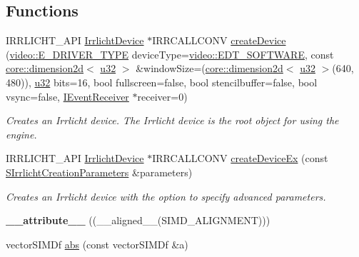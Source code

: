 \subsection*{Functions}
\begin{DoxyCompactItemize}
\item 
I\+R\+R\+L\+I\+C\+H\+T\+\_\+\+A\+PI \hyperlink{classirr_1_1IrrlichtDevice}{Irrlicht\+Device} $\ast$I\+R\+R\+C\+A\+L\+L\+C\+O\+NV \hyperlink{namespaceirr_abaf4d8719cc26b0d30813abf85e47c76}{create\+Device} (\hyperlink{namespaceirr_1_1video_ae35a6de6d436c76107ad157fe42356d0}{video\+::\+E\+\_\+\+D\+R\+I\+V\+E\+R\+\_\+\+T\+Y\+PE} device\+Type=\hyperlink{namespaceirr_1_1video_ae35a6de6d436c76107ad157fe42356d0a1598cd235a1a6bd052e2011b559e8995}{video\+::\+E\+D\+T\+\_\+\+S\+O\+F\+T\+W\+A\+RE}, const \hyperlink{classirr_1_1core_1_1dimension2d}{core\+::dimension2d}$<$ \hyperlink{namespaceirr_a0416a53257075833e7002efd0a18e804}{u32} $>$ \&window\+Size=(\hyperlink{classirr_1_1core_1_1dimension2d}{core\+::dimension2d}$<$ \hyperlink{namespaceirr_a0416a53257075833e7002efd0a18e804}{u32} $>$(640, 480)), \hyperlink{namespaceirr_a0416a53257075833e7002efd0a18e804}{u32} bits=16, bool fullscreen=false, bool stencilbuffer=false, bool vsync=false, \hyperlink{classirr_1_1IEventReceiver}{I\+Event\+Receiver} $\ast$receiver=0)
\begin{DoxyCompactList}\small\item\em Creates an Irrlicht device. The Irrlicht device is the root object for using the engine. \end{DoxyCompactList}\item 
I\+R\+R\+L\+I\+C\+H\+T\+\_\+\+A\+PI \hyperlink{classirr_1_1IrrlichtDevice}{Irrlicht\+Device} $\ast$I\+R\+R\+C\+A\+L\+L\+C\+O\+NV \hyperlink{namespaceirr_ac83a30d674204dcb94d70f849e9b4a62}{create\+Device\+Ex} (const \hyperlink{structirr_1_1SIrrlichtCreationParameters}{S\+Irrlicht\+Creation\+Parameters} \&parameters)
\begin{DoxyCompactList}\small\item\em Creates an Irrlicht device with the option to specify advanced parameters. \end{DoxyCompactList}\item 
{\bfseries \+\_\+\+\_\+attribute\+\_\+\+\_\+} ((\+\_\+\+\_\+aligned\+\_\+\+\_\+(S\+I\+M\+D\+\_\+\+A\+L\+I\+G\+N\+M\+E\+NT)))\hypertarget{namespaceirr_a0ddd30252b9413995f4de49e41628d79}{}\label{namespaceirr_a0ddd30252b9413995f4de49e41628d79}

\item 
vector\+S\+I\+M\+Df \hyperlink{namespaceirr_ae1f6e17b55f855b5381596c4a2c70abb}{abs} (const vector\+S\+I\+M\+Df \&a)\hypertarget{namespaceirr_ae1f6e17b55f855b5381596c4a2c70abb}{}\label{namespaceirr_ae1f6e17b55f855b5381596c4a2c70abb}


\end{DoxyCompactItemize}
